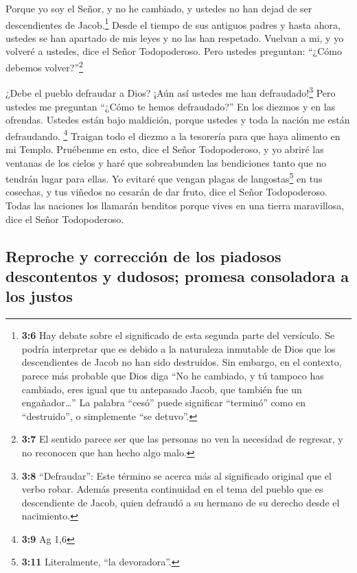  Porque yo soy el Señor, y no he cambiado, y ustedes no
han dejad de ser descendientes de Jacob.\footnote{\textbf{3:6} Hay
  debate sobre el significado de esta segunda parte del versículo. Se
  podría interpretar que es debido a la naturaleza inmutable de Dios que
  los descendientes de Jacob no han sido destruidos. Sin embargo, en el
  contexto, parece más probable que Dios diga ``No he cambiado, y tú
  tampoco has cambiado, eres igual que tu antepasado Jacob, que también
  fue un engañador\ldots{}'' La palabra ``cesó'' puede significar
  ``terminó'' como en ``destruido'', o simplemente ``se detuvo''.}
 Desde el tiempo de sus antiguos padres y hasta ahora,
ustedes se han apartado de mis leyes y no las han respetado. Vuelvan a
mi, y yo volveré a ustedes, dice el Señor Todopoderoso. Pero ustedes
preguntan: ``¿Cómo debemos volver?''\footnote{\textbf{3:7} El sentido
  parece ser que las personas no ven la necesidad de regresar, y no
  reconocen que han hecho algo malo.}

 ¿Debe el pueblo defraudar a Dios? ¡Aún así ustedes me han
defraudado!\footnote{\textbf{3:8} ``Defraudar'': Este término se acerca
  más al significado original que el verbo robar. Además presenta
  continuidad en el tema del pueblo que es descendiente de Jacob, quien
  defraudó a su hermano de su derecho desde el nacimiento.} Pero ustedes
me preguntan ``¿Cómo te hemos defraudado?'' En los diezmos y en las
ofrendas.  Ustedes están bajo maldición, porque ustedes y
toda la nación me están defraudando. \footnote{\textbf{3:9} Ag 1,6}
 Traigan todo el diezmo a la tesorería para que haya
alimento en mi Templo. Pruébenme en esto, dice el Señor Todopoderoso, y
yo abriré las ventanas de los cielos y haré que sobreabunden las
bendiciones tanto que no tendrán lugar para ellas.  Yo
evitaré que vengan plagas de langostas\footnote{\textbf{3:11}
  Literalmente, ``la devoradora''.} en tus cosechas, y tus viñedos no
cesarán de dar fruto, dice el Señor Todopoderoso.  Todas
las naciones los llamarán benditos porque vives en una tierra
maravillosa, dice el Señor Todopoderoso.

\hypertarget{reproche-y-correcciuxf3n-de-los-piadosos-descontentos-y-dudosos-promesa-consoladora-a-los-justos}{%
\subsection{Reproche y corrección de los piadosos descontentos y
dudosos; promesa consoladora a los
justos}\label{reproche-y-correcciuxf3n-de-los-piadosos-descontentos-y-dudosos-promesa-consoladora-a-los-justos}}

